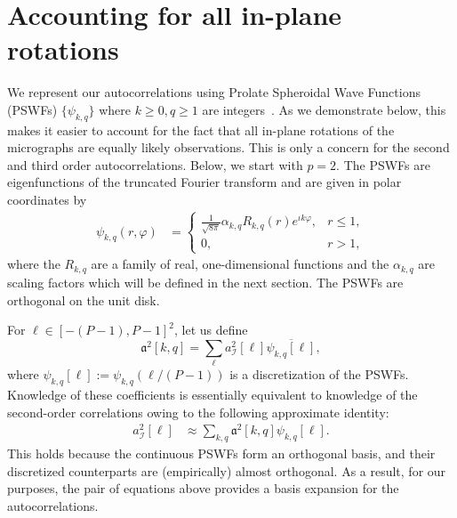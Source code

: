 \documentclass[english,11pt]{article}
\newcommand{\1}{\mathbf{1}}
\newcommand{\II}{\mathcal{I}}
\newcommand*\Bell{\ensuremath{\boldsymbol\ell}}
\newcommand{\TODO}[1]{{\color{red}{[#1]}}}
\numberwithin{equation}{section}
\theoremstyle{plain}
\theoremstyle{definition}
\theoremstyle{remark}
\theoremstyle{plain}
\theoremstyle{remark}
\theoremstyle{plain}
\theoremstyle{plain}
\begin{document}
\section{Accounting for all in-plane rotations} \label{sec:steering}

We represent our autocorrelations using Prolate Spheroidal Wave Functions (PSWFs) $\{\psi_{k,q}\}$ where $k \geq 0, q \geq 1$ are integers~\cite{slepian1964pswfIV}. As we demonstrate below, this makes it easier to account for the fact that all in-plane rotations of the micrographs are equally likely observations. This is only a concern for the second and third order autocorrelations. Below, we start with $p=2$.
The PSWFs are eigenfunctions of the truncated Fourier transform and are given in polar coordinates by
\begin{align}
	\psi_{k,q}(r,\varphi) & = \left\{\begin{array}{ll} \frac{1}{\sqrt{8\pi}}\alpha_{k,q}R_{k,q}(r)e^{\iota k\varphi}, & r\leq 1,\\ 0, & r>1,\end{array}\right. \label{eq:prolatesdef}
\end{align}
\TODO{Ref eq. 8 in Boris' paper}
where the ${R_{k,q}}$ are a family of real, one-dimensional functions and the ${\alpha_{k,q}}$ are  scaling factors which will be defined in the next section.
The PSWFs are orthogonal on the unit disk.

For $\Bell \in [-(P-1), P-1]^2$, let us define 
\begin{equation} \label{eq:PSWF_expansion}
\mathfrak{a}^2[k, q]  =
\sum_{\Bell}a^2_\II[\Bell]\overline{\psi_{k,q}[\Bell]}, \end{equation}
where $\psi_{k,q}[\Bell] := \psi_{k,q}(\Bell/(P-1))$ is a discretization of the PSWFs. \TODO{Range of $k,q$? need approx orthonormality in discrete...}
Knowledge of these coefficients is essentially equivalent to knowledge of the second-order correlations owing to the following approximate identity:
\begin{align}
 a^2_\II[\Bell] & \approx \sum_{k,q}\mathfrak{a}^2[k,q]\psi_{k,q}[\Bell].
 \label{eq:approxprolatesdiscrete}
\end{align}
This holds because the continuous PSWFs form an orthogonal basis, and their discretized counterparts are (empirically) almost orthogonal. As a result, for our purposes, the pair of equations above provides a basis expansion for the autocorrelations.
\end{document}
